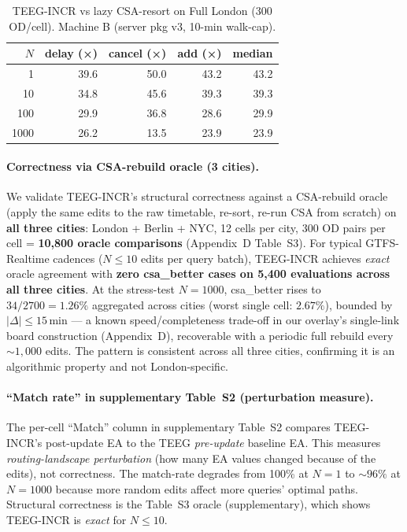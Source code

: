 \documentclass[letterpaper]{article}
\theoremstyle{definition}
\theoremstyle{plain}
\begin{document}
\begin{table}[t]
\centering
\caption{TEEG-INCR vs lazy CSA-resort on Full London (300
OD/cell). Machine B (server pkg v3, 10-min walk-cap).}
\label{tab:lazy-csa}
\small
\begin{tabular}{rrrrr}
\toprule
$N$ & delay (×) & cancel (×) & add (×) & median \\
\midrule
1    & 39.6 & 50.0 & 43.2 & 43.2 \\
10   & 34.8 & 45.6 & 39.3 & 39.3 \\
100  & 29.9 & 36.8 & 28.6 & 29.9 \\
1000 & 26.2 & 13.5 & 23.9 & 23.9 \\
\bottomrule
\end{tabular}
\end{table}

\paragraph{Correctness via CSA-rebuild oracle (3 cities).}
We validate TEEG-INCR's structural correctness against a CSA-rebuild
oracle (apply the same edits to the raw timetable, re-sort, re-run
CSA from scratch) on \textbf{all three cities}: London + Berlin + NYC,
12 cells per city, 300 OD pairs per cell = \textbf{10{,}800
oracle comparisons} (Appendix~D Table~S3). For typical GTFS-Realtime
cadences ($N \leq 10$ edits per query batch), TEEG-INCR achieves
\emph{exact} oracle agreement with \textbf{zero csa\_better cases on
5{,}400 evaluations across all three cities}. At the stress-test
$N\!=\!1000$, csa\_better rises to $34 / 2700 = 1.26\%$ aggregated
across cities (worst single cell: $2.67\%$), bounded by
$|\Delta| \leq 15$\,min --- a known speed/completeness trade-off in
our overlay's single-link board construction (Appendix~D), recoverable
with a periodic full rebuild every $\sim\!1{,}000$ edits. The pattern
is consistent across all three cities, confirming it is an algorithmic
property and not London-specific.

\paragraph{``Match rate'' in supplementary Table~S2 (perturbation
measure).}
The per-cell ``Match'' column in supplementary Table~S2 compares
TEEG-INCR's post-update EA to the TEEG \emph{pre-update} baseline EA.
This measures \emph{routing-landscape perturbation} (how many EA values
changed because of the edits), not correctness. The match-rate
degrades from 100\% at $N\!=\!1$ to $\sim\!96\%$ at $N\!=\!1000$
because more random edits affect more queries' optimal paths.
Structural correctness is the
Table~S3 oracle (supplementary), which shows TEEG-INCR is
\emph{exact} for $N \leq 10$.
\end{document}
